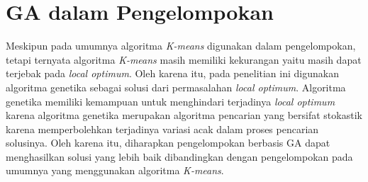 \section{GA dalam Pengelompokan}
Meskipun pada umumnya algoritma \textit{K-means} digunakan dalam pengelompokan, tetapi ternyata algoritma \textit{K-means} masih memiliki kekurangan yaitu masih dapat terjebak pada \textit{local optimum}. Oleh karena itu, pada penelitian ini digunakan algoritma genetika sebagai solusi dari permasalahan \textit{local optimum}. Algoritma genetika memiliki kemampuan untuk menghindari terjadinya \textit{local optimum} karena algoritma genetika merupakan algoritma pencarian yang bersifat stokastik karena memperbolehkan terjadinya variasi acak dalam proses pencarian solusinya. Oleh karena itu, diharapkan pengelompokan berbasis GA dapat menghasilkan solusi yang lebih baik dibandingkan dengan pengelompokan pada umumnya yang menggunakan algoritma \textit{K-means}.

